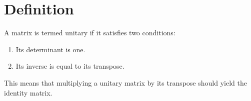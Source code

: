 \section{Definition}

\begin{definition}
    A matrix is termed unitary if it satisfies two conditions:
\end{definition}
\begin{enumerate}
    \item Its determinant is one.
    \item Its inverse is equal to its transpose.
\end{enumerate}

This means that multiplying a unitary matrix by its transpose should yield the identity matrix. 